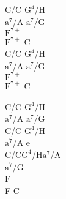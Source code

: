 \begin{chord}
    C/C $\mathrm{G^4}$/H\\
    $\mathrm{a^7}$/A $\mathrm{a^7}$/G\\
    $\mathrm{F^{7+}}$\\
    $\mathrm{F^{7+}}$ C\\
    C/C $\mathrm{G^4}$/H\\
    $\mathrm{a^7}$/A $\mathrm{a^7}$/G\\
    $\mathrm{F^{7+}}$\\
    $\mathrm{F^{7+}}$ C

    C/C $\mathrm{G^4}$/H\\
    $\mathrm{a^7}$/A $\mathrm{a^7}$/G\\
    C/C $\mathrm{G^4}$/H\\
    $\mathrm{a^7}$/A e\\
    C/C$\mathrm{G^4}$/H$\mathrm{a^7}$/A\\
    $\mathrm{a^7}$/G\\
    F\\
    F C
\end{chord}
